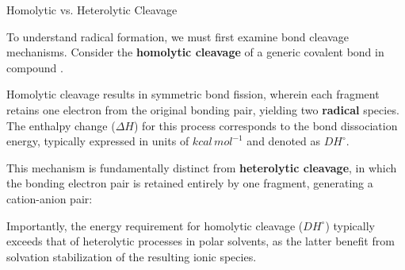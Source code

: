 \documentclass[10pt]{article}
\begin{document}
    \begin{core}{Homolytic vs. Heterolytic Cleavage}

      To understand radical formation, we must first examine bond cleavage mechanisms. Consider the \textbf{homolytic cleavage} of a generic covalent bond in compound .


      Homolytic cleavage results in symmetric bond fission, wherein each fragment retains one electron from the original bonding pair, yielding two \textbf{radical} species. The enthalpy change ($\Delta H$) for this process corresponds to the bond dissociation energy, typically expressed in units of $kcal\,mol^{-1}$ and denoted as $DH^{\circ}$.

      This mechanism is fundamentally distinct from \textbf{heterolytic cleavage}, in which the bonding electron pair is retained entirely by one fragment, generating a cation-anion pair:


      Importantly, the energy requirement for homolytic cleavage ($DH^{\circ}$) typically exceeds that of heterolytic processes in polar solvents, as the latter benefit from solvation stabilization of the resulting ionic species.

    \end{core} 
\end{document}
